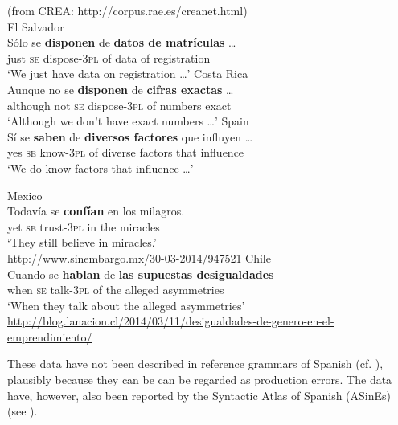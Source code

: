 \documentclass[output=paper]{langsci/langscibook}
\begin{document}
\ea%
    (from CREA: http://corpus.rae.es/creanet.html)\label{ex:gallego:28}\\
    \ea  El Salvador\\
    \gll Sólo se  \textbf{disponen}     de  \textbf{datos de  matrículas} …     \\
         just  \textsc{se}   dispose{}-\textsc{3pl} of  data    of  registration\\
    \glt ‘We just have data on registration …’
    \ex  Costa Rica\\
    \gll Aunque   no   se \textbf{disponen}      de  \textbf{cifras       exactas} …  \\
         although not \textsc{se}   dispose{}-\textsc{3pl}  of   numbers  exact\\
    \glt ‘Although we don’t have exact numbers …’
    \ex  Spain\\
    \gll   Sí   se  \textbf{saben}        de \textbf{diversos factores} que influyen …  \\
           yes \textsc{se}   know{}-\textsc{3pl}  of  diverse   factors    that influence\\
    \glt   ‘We do know factors that influence …’
    \z
\z    


\ea%
    \label{ex:gallego:29}
    \ea  Mexico\\
    \gll Todavía se   \textbf{confían}    en  los   milagros.\\
         yet         \textsc{se}   trust{}-\textsc{3pl}  in  the   miracles\\
    \glt ‘They still believe in miracles.’\\
    {\small\url{http://www.sinembargo.mx/30-03-2014/947521}}
    \ex  Chile\\
    \gll Cuando se   \textbf{hablan}    de  \textbf{las supuestas desigualdades} \\
         when     \textsc{se}   talk{}-\textsc{3pl}   of  the alleged      asymmetries\\
    \glt ‘When they talk about the alleged asymmetries’\\
    {\small\url{http://blog.lanacion.cl/2014/03/11/desigualdades-de-genero-en-el-emprendimiento/}}
    \z
\z    

These data have not been described in reference grammars of Spanish (cf. \citealt{Bosque1999,RAE-ASALE2009}), plausibly because they can be can be regarded as production errors. The data have, however, also been reported by the Syntactic Atlas of Spanish (ASinEs) (see ).
\end{document}
